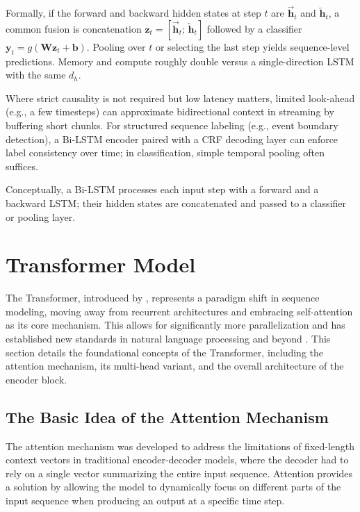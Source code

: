 Formally, if the forward and backward hidden states at step \(t\) are \(\overrightarrow{\mathbf{h}}_t\) and \(\overleftarrow{\mathbf{h}}_t\), a common fusion is concatenation \(\mathbf{z}_t = [\overrightarrow{\mathbf{h}}_t;\,\overleftarrow{\mathbf{h}}_t]\) followed by a classifier \(\mathbf{y}_t = g(\mathbf{W}\mathbf{z}_t + \mathbf{b})\). Pooling over \(t\) or selecting the last step yields sequence-level predictions. Memory and compute roughly double versus a single-direction LSTM with the same \(d_h\).
\par
Where strict causality is not required but low latency matters, limited look-ahead (e.g., a few timesteps) can approximate bidirectional context in streaming by buffering short chunks. For structured sequence labeling (e.g., event boundary detection), a Bi-LSTM encoder paired with a CRF decoding layer can enforce label consistency over time; in classification, simple temporal pooling often suffices.

Conceptually, a Bi-LSTM processes each input step with a forward and a backward LSTM; their hidden states are concatenated and passed to a classifier or pooling layer.


\section{Transformer Model}
\label{sec:related_technologies:transformer}

The Transformer, introduced by \citet{vaswani2017attention}, represents a paradigm shift in sequence modeling, moving away from recurrent architectures and embracing self-attention as its core mechanism. This allows for significantly more parallelization and has established new standards in natural language processing and beyond \citep{zhou2021informer, wen2021review}. This section details the foundational concepts of the Transformer, including the attention mechanism, its multi-head variant, and the overall architecture of the encoder block.

\subsection{The Basic Idea of the Attention Mechanism}
The attention mechanism was developed to address the limitations of fixed-length context vectors in traditional encoder-decoder models, where the decoder had to rely on a single vector summarizing the entire input sequence. Attention provides a solution by allowing the model to dynamically focus on different parts of the input sequence when producing an output at a specific time step.

